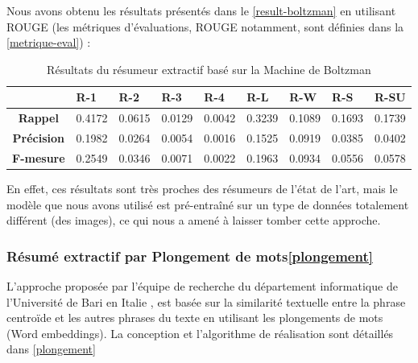 \begin{itemize}[leftmargin=*]
                Nous avons obtenu les résultats présentés dans le \autoref{result-boltzman} en utilisant ROUGE (les métriques d'évaluations, ROUGE notamment, sont définies dans la \autoref{metrique-eval}) : 
                \begin{table}[H]
                    \begin{center}
                        \begin{tabular}{|c|C{1.2cm}|C{1.2cm}|C{1.2cm}|C{1.2cm}|C{1.2cm}|C{1.2cm}|C{1.2cm}|C{1.2cm}|}
                             & \textbf{R-1} &  \textbf{R-2} &  \textbf{R-3} &  \textbf{R-4} &  \textbf{R-L} &  \textbf{R-W} &  \textbf{R-S} &  \textbf{R-SU} \\
                            \hline
                            \textbf{Rappel} & 0.4172 & 0.0615 & 0.0129 & 0.0042 & 0.3239 & 0.1089 & 0.1693 & 0.1739 \\
                            \hline
                            \textbf{Précision} & 0.1982 & 0.0264 & 0.0054 & 0.0016 & 0.1525 & 0.0919 & 0.0385 & 0.0402 \\
                            \hline
                            \textbf{F-mesure} & 0.2549 & 0.0346 & 0.0071 & 0.0022 & 0.1963 & 0.0934 & 0.0556 & 0.0578 \\
                            \hline
                        \end{tabular}
                    \end{center}
                    \caption{Résultats du résumeur extractif basé sur la Machine de Boltzman}
                    \label{result-boltzman}
                \end{table}
                En effet, ces résultats sont très proches des résumeurs de l'état de l'art, mais le modèle que nous avons utilisé est pré-entraîné sur un type de données totalement différent (des images), ce qui nous a amené à laisser tomber cette approche.   
            \end{itemize}

        \subsubsection{Résumé extractif par Plongement de mots\ref{plongement}}
        L'approche proposée par l'équipe de recherche du département informatique de l'Université de Bari en Italie \cite{bari}, est basée sur la similarité textuelle entre la phrase centroïde et les autres phrases du texte en utilisant les plongements de mots (Word embeddings). La conception et l'algorithme de réalisation sont détaillés dans \ref{plongement}       

